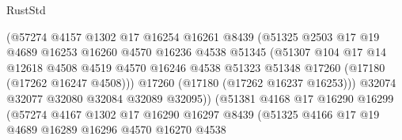 \begin{lexlean}{RustStd}
\begin{coremodule}
{\begin{coremodule}
{{{{{{{{{{{{{{{{{{{{{{{{{{{{{{{{{{{{{{{{{{{{{{{{{{{{{{{                                (@57274
                                  @4157
                                  @1302
                                  @17
                                  @16254
                                  @16261
                                  @8439
                                  (@51325
                                    @2503
                                    @17
                                    @19
                                    @4689
                                    @16253
                                    @16260
                                    @4570
                                    @16236
                                    @4538
                                    @51345
                                    (@51307
                                      @104
                                      @17
                                      @14
                                      @12618
                                      @4508
                                      @4519
                                      @4570
                                      @16246
                                      @4538
                                      @51323
                                      @51348
                                      @17260
                                      (@17180 (@17262 @16247 @4508)))
                                    @17260
                                    (@17180 (@17262 @16237 @16253)))
                                  @32074
                                  @32077
                                  @32080
                                  @32084
                                  @32089
                                  @32095))
                              (@51381
                                @4168
                                @17
                                @16290
                                @16299
                                (@57274
                                  @4167
                                  @1302
                                  @17
                                  @16290
                                  @16297
                                  @8439
                                  (@51325
                                    @4166
                                    @17
                                    @19
                                    @4689
                                    @16289
                                    @16296
                                    @4570
                                    @16270
                                    @4538
}}}}}}}}}}}}}}}}}}}}}}}}}}}}}}}}}}}}}}}}}}}}}}}}}}}}}}}
\end{coremodule}}
\end{coremodule}
\end{lexlean}
